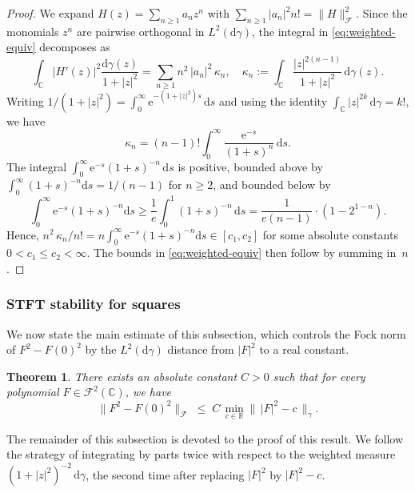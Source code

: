 \documentclass[11pt]{amsart}
\newtheorem{theorem}{Theorem}[section]
\theoremstyle{remark}
\newcommand{\C}{\mathbb{C}}
\newcommand{\abs}[1]{\lvert #1 \rvert}
\newcommand{\norm}[1]{\lVert #1 \rVert}
\newcommand{\dd}{\mathrm{d}}
\newcommand{\ee}{\mathrm{e}}
\begin{document}
\begin{proof}
We expand $H(z) = \sum_{n \ge 1} a_n z^n$ with $\sum_{n\ge1} \abs{a_n}^2 n!
= \norm{H}_{\mathcal{F}}^2$. Since the monomials $z^n$ are pairwise
orthogonal in $L^2(\dd\gamma)$, the integral in
\eqref{eq:weighted-equiv} decomposes as
\[
\int_{\C} \abs{H'(z)}^2 \frac{\dd\gamma(z)}{1+\abs{z}^2}
= \sum_{n \ge 1} n^2\, \abs{a_n}^2\, \kappa_n,
\quad
\kappa_n := \int_{\C} \frac{\abs{z}^{2(n-1)}}{1+\abs{z}^2}\, \dd\gamma(z).
\]
Writing $1/(1+\abs{z}^2) = \int_0^\infty \ee^{-(1+\abs{z}^2)s}\,\dd s$ and
using the identity $\int_{\C}\abs{z}^{2k}\,\dd\gamma = k!$, we have
\[
\kappa_n
= (n-1)! \int_0^\infty \frac{\ee^{-s}}{(1+s)^n}\, \dd s.
\]
The integral $\int_0^\infty \ee^{-s}(1+s)^{-n}\,\dd s$ is positive, bounded
above by $\int_0^\infty (1+s)^{-n}\dd s = 1/(n-1)$ for $n \ge 2$, and bounded
below by 
$$\int_0^\infty \ee^{-s}(1+s)^{-n}\dd s \geq \frac{1}{e} \int_0^1 (1+s)^{-n} \, \dd s =  \frac{1}{e(n-1)} \cdot \left( 1 - 2^{1-n}\right).$$ Hence,
$n^2\,\kappa_n / n! = n \int_0^\infty \ee^{-s}(1+s)^{-n}\dd s \in [c_1, c_2]$
for some absolute constants $0 < c_1 \le c_2 < \infty$. The bounds in
\eqref{eq:weighted-equiv} then follow by summing in~$n$.
\end{proof}

\subsubsection{STFT stability for squares}\label{sec:squaring}
We now state the main estimate of this subsection, which controls the
Fock norm of $F^2 - F(0)^2$ by the $L^2(\dd\gamma)$ distance from
$\abs{F}^2$ to a real constant.

\begin{theorem}\label{thm:squaring}
There exists an absolute constant $C > 0$ such that for every polynomial
$F \in \mathcal{F}^2(\C)$, we have
\begin{equation}\label{eq:squaring-min}
\norm{F^2 - F(0)^2}_{\mathcal{F}}
\;\le\;
C\, \min_{c \in \mathbb{R}}\bigl\|\, \abs{F}^2 - c \,\bigr\|_{\gamma}.
\end{equation}
\end{theorem}

The remainder of this subsection is devoted to the proof of this result. We follow the strategy
of integrating by parts twice with respect to the weighted measure
$(1+\abs{z}^2)^{-2}\,\dd\gamma$, the second time after replacing $\abs{F}^2$
by $\abs{F}^2 - c$. 
\end{document}
